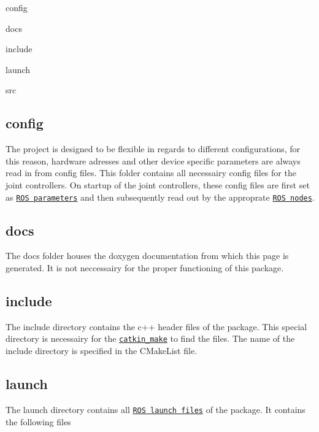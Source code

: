 \begin{DoxyItemize}
\item config
\item docs
\item include
\item launch
\item src 
\end{DoxyItemize}\hypertarget{index_config_dir}{}\subsection{config}\label{index_config_dir}
The project is designed to be flexible in regards to different configurations, for this reason, hardware adresses and other device specific parameters are always read in from config files. This folder contains all necessairy config files for the joint controllers. On startup of the joint controllers, these config files are first set as \href{http://wiki.ros.org/Parameter%20Server}{\tt R\+OS parameters} and then subsequently read out by the approprate \href{http://wiki.ros.org/Nodes}{\tt R\+OS nodes}. \hypertarget{index_docs_dir}{}\subsection{docs}\label{index_docs_dir}
The docs folder houses the doxygen documentation from which this page is generated. It is not neccessairy for the proper functioning of this package. \hypertarget{index_include_dir}{}\subsection{include}\label{index_include_dir}
The include directory contains the c++ header files of the package. This special directory is necessairy for the \href{http://wiki.ros.org/catkin/commands/catkin_make}{\tt catkin\+\_\+make} to find the files. The name of the include directory is specified in the C\+Make\+List file. \hypertarget{index_launch_dir}{}\subsection{launch}\label{index_launch_dir}
The launch directory contains all \href{http://wiki.ros.org/roslaunch}{\tt R\+OS launch files} of the package. It contains the following files


